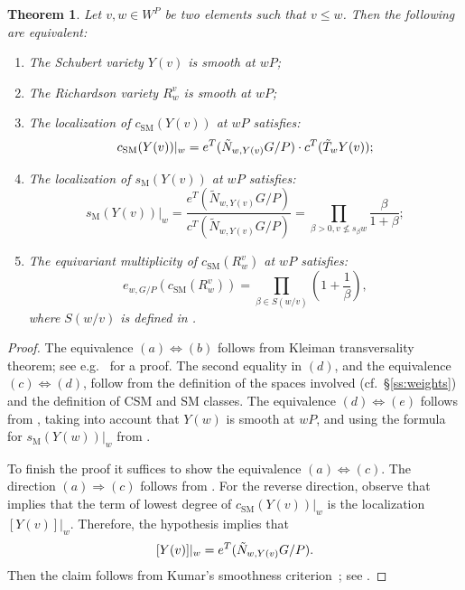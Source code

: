 \documentclass[11pt]{article}
\newtheorem{theorem}[theo]{Theorem}
\theoremstyle{definition}
\numberwithin{equation}{section}
\newcommand{\csm}{c_{\mathrm{SM}}}
\newcommand{\ssm}{s_{\mathrm{M}}}
\begin{document}
\begin{theorem}\label{thm:smoothP} Let $v,w \in W^P$ be two elements such that $v \le w$.
	Then the following are equivalent:
	\begin{enumerate}
		\item[(a)] The Schubert variety $Y(v)$ is smooth at $wP$;
		\item[(b)] The Richardson variety $R_w^v$ is smooth at $wP$;
		\item[(c)] The localization of $\csm(Y(v))$ at $wP$ satisfies:
		\[ \csm(Y(v))|_{w}= e^T(\tilde{N}_{w,Y(v)}G/P) \cdot c^T(\tilde{T}_{w}Y(v)) \/;\]
		
		\item[(d)] The localization of $\ssm(Y(v))$ at $wP$ satisfies:
		\[ \ssm(Y(v))|_{w}= \frac{e^T(\tilde{N}_{w,Y(v)}G/P)}{c^T(\tilde{N}_{w,Y(v)}G/P)} = \prod_{\beta>0, v\nleq s_\beta w} \frac{\beta}{1+\beta}
		;\]
		
		\item[(e)] The equivariant multiplicity of $\csm(R_w^v)$ at $wP$ satisfies:
		\[e_{w,G/P} (\csm(R_w^{v}))= \prod_{\beta\in S(w/v)} (1+\frac{1}{\beta}),\]
		where $S(w/v)$ is defined in .
	\end{enumerate}
\end{theorem}
\begin{proof} The equivalence $(a) \Leftrightarrow (b)$ follows from Kleiman transversality theorem; see e.g.~\cite[Cor.~2.10]{billey.coskun:singularities} for a proof. The second equality in $(d)$, and the equivalence $(c) \Leftrightarrow (d)$,
	follow from the definition of the spaces involved (cf.~\S\ref{ss:weights}) and the definition of CSM and SM classes. The equivalence $(d) \Leftrightarrow (e)$ follows from , taking into account that $Y(w)$ is smooth at $wP$, and using
	the formula for $\ssm(Y(w))|_w$ from . 
	
	To finish the proof it suffices to show the equivalence $(a) \Leftrightarrow (c)$. The direction \mbox{$(a) \Rightarrow (c)$} 
	follows from . For the reverse direction, observe that  implies that the term 
	of lowest degree of $\csm(Y(v))|_w$ is the localization $[Y(v)]|_w$. Therefore, the hypothesis implies that 
	\[ [Y(v)]|_w = e^T(\tilde{N}_{w,Y(v)}G/P)\/.\]
	Then the claim follows from Kumar's smoothness criterion~\cite{kumar1996nil}; see .
\end{proof}
\end{document}

